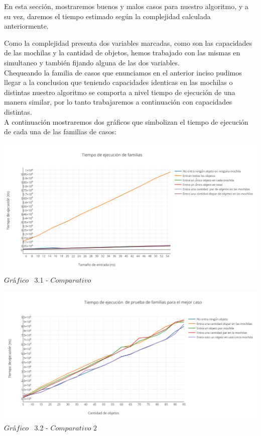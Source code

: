 \indent En esta secci\'on, mostraremos buenos y malos casos para nuestro algoritmo, y a su vez, daremos el tiempo estimado 
seg\'un la complejidad calculada anteriormente.

Como la complejidad presenta dos variables marcadas, como son las capacidades de las mochilas y la cantidad de objetos, hemos trabajado con las mismas en simultaneo y tambi\'en fijando alguna de las dos variables.\\


Chequeando la familia de casos que enunciamos en el anterior inciso pudimos llegar a la conclusion que teniendo capacidades identicas en las mochilas o distintas nuestro algoritmo se comporta a nivel tiempo de ejecuci\'on de una manera similar, por lo tanto trabajaremos a continuaci\'on con capacidades distintas.\\

A continuaci\'on mostraremos dos gr\'aficos que simbolizan el tiempo de ejecuci\'on de cada una de las familias de casos:\\

\vspace*{0.3cm} \vspace*{0.3cm}
  \begin{center}
 \includegraphics[scale=0.65]{./EJ3/comparativo.png}
 {$Gr$\'a$fico$ \ 3.1 - $Comparativo$}
  \end{center}
  \vspace*{0.3cm}

\vspace*{0.3cm} \vspace*{0.3cm}
  \begin{center}
 \includegraphics[scale=0.65]{./EJ3/comparativo1.png}
 {$Gr$\'a$fico$ \ 3.2 - $Comparativo$ $2$}
  \end{center}
  \vspace*{0.3cm}

